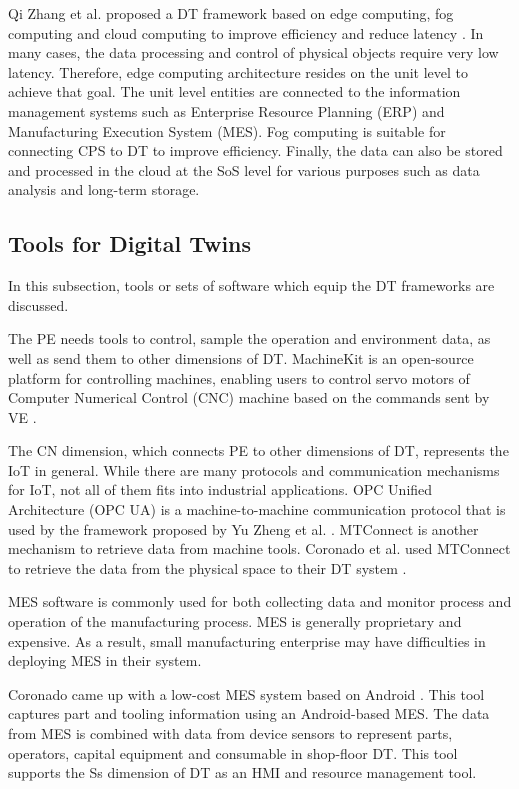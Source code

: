 \documentclass[article,table]{aaltoseries}
\begin{document}
Qi Zhang et al. proposed a DT framework based on edge computing, fog computing and cloud computing to improve efficiency and reduce latency \cite{qi2018modeling}. In many cases, the data processing and control of physical objects require very low latency. Therefore, edge computing architecture resides on the unit level to achieve that goal. The unit level entities are connected to the information management systems such as Enterprise Resource Planning (ERP) and Manufacturing Execution System (MES). Fog computing is suitable for connecting CPS to DT to improve efficiency. Finally, the data can also be stored and processed in the cloud at the SoS level for various purposes such as data analysis and long-term storage.

\subsection{Tools for Digital Twins}
In this subsection, tools or sets of software which equip the DT frameworks are discussed. 

The PE needs tools to control, sample the operation and environment data, as well as send them to other dimensions of DT. MachineKit is an open-source platform for controlling machines, enabling users to control servo motors of Computer Numerical Control (CNC) machine based on the commands sent by VE \cite{lynn2018realization}.

The CN dimension, which connects PE to other dimensions of DT, represents the IoT in general. While there are many protocols and communication mechanisms for IoT, not all of them fits into industrial applications. OPC Unified Architecture (OPC UA) is a machine-to-machine communication protocol that is used by the framework proposed by Yu Zheng et al. \cite{zheng2019application}. MTConnect is another mechanism to retrieve data from machine tools. Coronado et al. used MTConnect to retrieve the data from the physical space to their DT system \cite{UrbinaCoronado2018}.

MES software is commonly used for both collecting data and monitor process and operation of the manufacturing process. MES is generally proprietary and expensive. As a result, small manufacturing enterprise may have difficulties in deploying MES in their system.

Coronado  came up with a low-cost MES system based on Android \cite{UrbinaCoronado2018}. This tool captures part and tooling information using an Android-based MES. The data from MES is combined with data from device sensors to represent parts, operators, capital equipment and consumable in shop-floor DT. This tool supports the Ss dimension of DT as an HMI and resource management tool.
\end{document}
